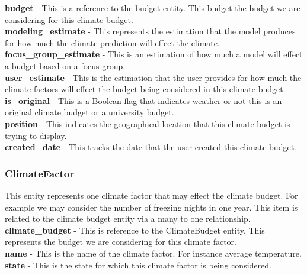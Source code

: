 \documentclass[onecolumn, draftclsnofoot,10pt, compsoc]{article}
\begin{document}
					\textbf{budget} - This is a reference to the budget entity. This budget the budget we are considering for this climate budget.\\

					\textbf{modeling\_estimate} - This represents the estimation that the model produces for how much the climate prediction will effect the climate.\\

					\textbf{focus\_group\_estimate} - This is an estimation of how much a model will effect a budget based on a focus group.\\

					\textbf{user\_estimate} - This is the estimation that the user provides for how much the climate factors will effect the budget being considered in this climate budget.\\

					\textbf{is\_original} - This is a Boolean flag that indicates weather or not this is an original climate budget or a university budget.\\

					\textbf{position} - This indicates the geographical location that this climate budget is trying to display.\\

					\textbf{created\_date} - This tracks the date that the user created this climate budget.\\

				\subsubsection{ClimateFactor}
					This entity represents one climate factor that may effect the climate budget. For example we may consider the number of freezing nights in one year. This item is related to the climate budget entity via a many to one relationship.\\

					\textbf{climate\_budget} - This is reference to the ClimateBudget entity. This represents the budget we are considering for this climate factor.\\

					\textbf{name} - This is the name of the climate factor. For instance average temperature.\\

					\textbf{state} - This is the state for which this climate factor is being considered.\\
\end{document}
